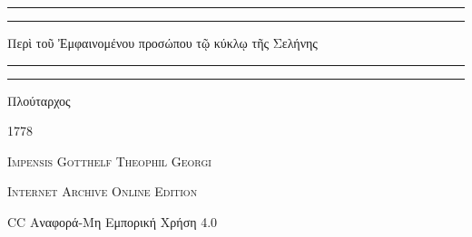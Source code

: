 \documentclass[a4paper, 11pt, oneside, polutonikogreek, german]{article}
\begin{document}
\begin{titlepage} %
	\centering %


	\rule{\textwidth}{1.6pt}\vspace*{-\baselineskip}\vspace*{2pt} %
	\rule{\textwidth}{0.4pt} %
	
	\vspace{1\baselineskip} %
	
	{\Huge Περὶ τοῦ Ἐμφαινομένου προσώπου τῷ κύκλῳ τῆς Σελήνης}
	
	\vspace{1\baselineskip} %

	\rule{\textwidth}{0.4pt}\vspace*{-\baselineskip}\vspace{3.2pt} %
	\rule{\textwidth}{1.6pt} %
	
	\vspace{1\baselineskip} %
	
	
	{\Large Πλούταρχος}
 
        \vspace{0.5\baselineskip}
	
	\vspace*{1\baselineskip} %
	
        {\scshape \normalsize } %

        \vspace*{\fill}    

	\vspace{1\baselineskip}

	{\small\scshape 1778}
	
	{\small\scshape{Impensis Gotthelf Theophil Georgi}}
	
	\vspace{0.5\baselineskip} %

        {\scshape Internet Archive Online Edition}%
    
	{\small CC Αναφορά-Μη Εμπορική Χρήση 4.0} %
\end{titlepage}
\setlength{\parskip}{1mm plus1mm minus1mm}
\clearpage
\end{document}
